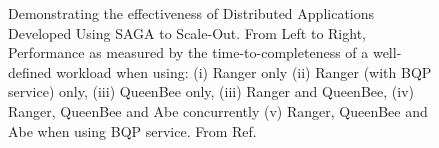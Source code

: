 \documentclass[a4paper,10pt]{article}
\begin{document}
\begin{figure}
\begin{center}
\end{center}
\caption{Demonstrating the effectiveness of Distributed Applications Developed  Using SAGA to Scale-Out. From Left to Right, Performance as measured by the time-to-completeness of a well-defined workload when using: (i) Ranger only (ii) Ranger (with BQP service) only, (iii) QueenBee only, (iii) Ranger and QueenBee, (iv) Ranger, QueenBee and Abe concurrently (v) Ranger, QueenBee 
  and Abe when using BQP service. From Ref.~\cite{gmac} }
\label{fig:results}
\end{figure}
\end{document}
